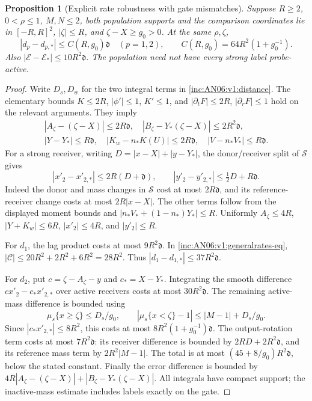 \documentclass[11pt]{article}
\numberwithin{equation}{section}
\newtheorem{proposition}[theorem]{Proposition}
\theoremstyle{remark}\newtheorem{remark}[theorem]{Remark}
\newcommand{\1}{\mathbf 1}
\begin{document}
\begin{proposition}[Explicit rate robustness with gate mismatches]
\label{inc:AN06:v1:ratebound}
Suppose $R\ge2$, $0<\rho\le1$, $M,N\le2$, both population supports and
the comparison coordinates lie in $[-R,R]^2$, $|\zeta|\le R$, and
$\zeta-X\ge g_0>0$. At the same $\rho,\zeta$,
\begin{equation}\label{inc:AN06:v1:ratebound-eq}
 |d_p-d_{p,*}|\le C(R,g_0)\mathfrak d\quad(p=1,2),\qquad
 C(R,g_0)=64R^2(1+g_0^{-1}).
\end{equation}
Also $|\mathcal E-\mathcal E_*|\le10R^2\mathfrak d$.
The population need not have every strong label probe-active.
\end{proposition}
\begin{proof}
Write $D_s,D_w$ for the two integral terms in
\eqref{inc:AN06:v1:distance}. The elementary bounds
$K\le2R$, $|\phi'|\le1$, $K'\le1$, and
$|\partial_tF|\le2R$, $|\partial_rF|\le1$ hold on the relevant arguments.
They imply
\begin{gather*}
 |A_\zeta-(\zeta-X)|\le2R\mathfrak d,\quad
 |B_\zeta-Y_*(\zeta-X)|\le2R^2\mathfrak d,\\
 |Y-Y_*|\le R\mathfrak d,\quad
 |K_w-n_*K(U)|\le2R\mathfrak d,\quad
 |V-n_*V_*|\le R\mathfrak d.
\end{gather*}
For a strong receiver, writing $D=|x-X|+|y-Y_*|$, the donor/receiver split
of $\mathcal S$ gives
\[
 |x'_2-x'_{2,*}|\le2R(D+\mathfrak d),\qquad
 |y'_2-y'_{2,*}|\le\tfrac12D+R\mathfrak d.
\]
Indeed the donor and mass changes in $\mathcal S$ cost at most
$2R\mathfrak d$, and its reference-receiver change costs at most
$2R|x-X|$. The other terms follow from the displayed moment bounds and
$|n_*V_*+(1-n_*)Y_*|\le R$.
Uniformly $A_\zeta\le4R$, $|Y+K_w|\le6R$, $|x'_2|\le4R$, and
$|y'_2|\le R$.

For $d_1$, the lag product costs at most $9R^2\mathfrak d$.
In \eqref{inc:AN06:v1:generalrates-eq},
$|\mathcal C|\le20R^2+2R^2+6R^2=28R^2$.
Thus $|d_1-d_{1,*}|\le37R^2\mathfrak d$.

For $d_2$, put $c=\zeta-A_\zeta-y$ and $c_*=X-Y_*$.
Integrating the smooth difference $cx'_2-c_*x'_{2,*}$ over active
receivers costs at most $30R^2\mathfrak d$.
The remaining active-mass difference is bounded using
\[
 \mu_s\{x\ge\zeta\}\le D_s/g_0,\qquad
 |\mu_s\{x<\zeta\}-1|\le|M-1|+D_s/g_0.
\]
Since $|c_*x'_{2,*}|\le8R^2$, this costs at most
$8R^2(1+g_0^{-1})\mathfrak d$.
The output-rotation term costs at most $7R^2\mathfrak d$:
its receiver difference is bounded by $2RD+2R^2\mathfrak d$, and its
reference mass term by $2R^2|M-1|$.
The total is at most $(45+8/g_0)R^2\mathfrak d$, below the stated constant.
Finally the error difference is bounded by
$4R|A_\zeta-(\zeta-X)|+|B_\zeta-Y_*(\zeta-X)|$.
All integrals have compact support; the inactive-mass estimate includes
labels exactly on the gate.
\end{proof}
\end{document}
